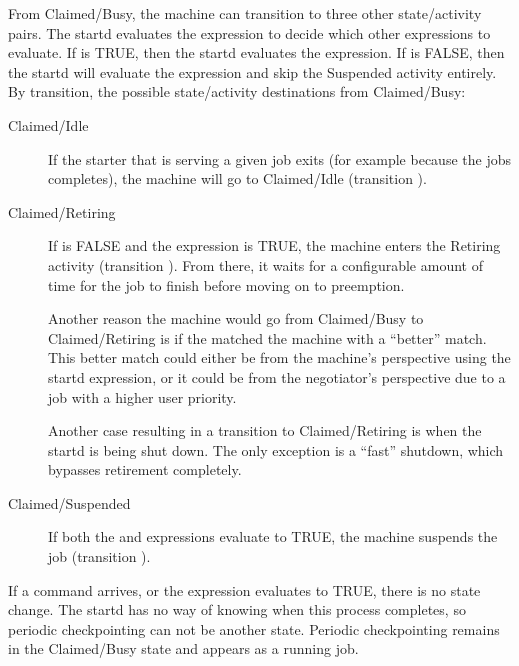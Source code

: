 From Claimed/Busy, the machine can transition to three other state/activity
pairs.
The startd evaluates the  expression to decide
which other expressions to evaluate.  
If  is TRUE, then the startd evaluates the
 expression.
If  is FALSE, then the startd will
evaluate the  expression and skip the Suspended activity
entirely.
By transition, the possible state/activity destinations from Claimed/Busy:

\begin{description}
  
\item[Claimed/Idle] If the starter that is serving a given job exits
  (for example because the jobs completes), the machine will go
  to Claimed/Idle (transition ).
  
\item[Claimed/Retiring] If  is FALSE and the
   expression is TRUE, the machine enters the
  Retiring activity (transition ).  From there, it
  waits for a configurable amount of time for the job to finish
  before moving on to preemption.

  Another reason the machine would go from Claimed/Busy to
  Claimed/Retiring is if the  matched the machine
  with a ``better'' match.  This better match could either be from the
  machine's perspective using the startd  expression,
  or it could be from the negotiator's perspective due to
  a job with a higher user priority.

  Another case resulting in a transition to Claimed/Retiring is when
  the startd is being shut down.  The only exception is a ``fast''
  shutdown, which bypasses retirement completely.
  
\item[Claimed/Suspended] If both the  and
   expressions evaluate to TRUE, the machine
  suspends the job (transition ).
  
\end{description}
  
If a  command arrives,
or the  expression evaluates to TRUE,
there is no state change.
The startd has no way of knowing when this process completes,
so periodic checkpointing can not be another state.
Periodic checkpointing remains in the Claimed/Busy state
and appears as a running job.


